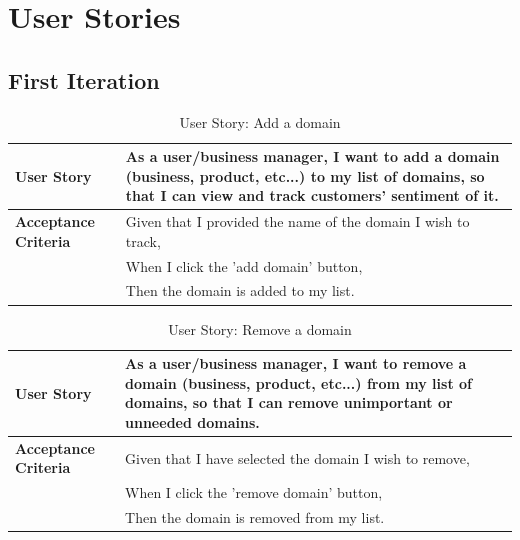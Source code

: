 \documentclass[12pt]{article}
\begin{document}
\section{User Stories}

\subsection{First Iteration}
\begin{table}[htbp]
\caption{User Story: Add a domain}
\begin{tabular}{|p{}|p{}|}
\hline
\textbf{User Story} & As a user/business manager, I want to add a domain (business, product, etc...) to my list of domains, so that I can view and track customers' sentiment of it. \\
\hline
\textbf{Acceptance Criteria} & 
Given that I provided the name of the domain I wish to track,\\
& When I click the 'add domain' button,\\
& Then the domain is added to my list. \\
\hline
\end{tabular}
\end{table}

\begin{table}[htbp]
\caption{User Story: Remove a domain}
\begin{tabular}{|p{}|p{}|}
\hline
\textbf{User Story} & As a user/business manager, I want to remove a domain (business, product, etc...) from my list of domains, so that I can remove unimportant or unneeded domains. \\
\hline
\textbf{Acceptance Criteria} & 
Given that I have selected the domain I wish to remove,\\
& When I click the 'remove domain' button,\\
& Then the domain is removed from my list. \\
\hline
\end{tabular}
\end{table}
\end{document}
